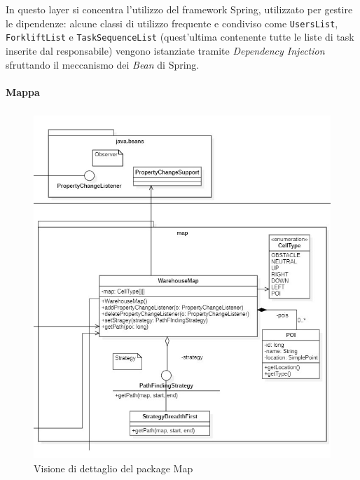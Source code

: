 In questo layer si concentra l'utilizzo del framework Spring, utilizzato per gestire le dipendenze: alcune classi di utilizzo frequente e condiviso come \texttt{UsersList}, \texttt{ForkliftList} e \texttt{TaskSequenceList} (quest'ultima contenente tutte le liste di task inserite dal responsabile) vengono istanziate tramite \textit{Dependency Injection} sfruttando il meccanismo dei \textit{Bean} di Spring.




\paragraph{Mappa}
\subparagraph*{ }

\begin{figure}[H]
	\centering
	\includegraphics[scale=0.60]{res/diagrams/server/server_pack_map.jpg}
	\caption{Visione di dettaglio del package Map}
\end{figure}


